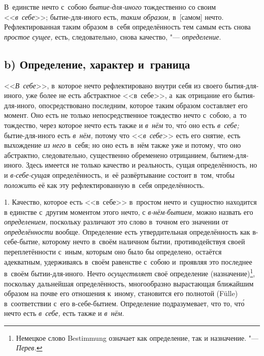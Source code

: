 В~единстве нечто с~собою {\em бытие-для-иного}
тождественно со своим <<{\em в~себе}>>; бытие-для-иного
есть, {\em таким образом,} в~[самом] нечто.
Рефлектированная таким образом в~себя определённость тем самым есть снова
{\em простое сущее,} есть, следовательно, снова
качество, "--- {\em определение}.

\subsection[b) Определение, характер и~граница]{b) Определение, характер и~граница}

<<{\em В~себе}>>, в~которое нечто рефлектировано внутри
себя из своего бытия-для-иного, уже более не есть абстрактное <<в~себе>>,
а~как отрицание его бытия-для-иного, опосредствовано последним, которое
таким образом составляет его момент. Оно есть не только непосредственное
тождество нечто с~собою, а~то тождество, через которое нечто есть также и
{\em в~нём} то, чт\'{о} оно есть {\em в~себе;}
бытие-для-иного есть {\em в~нём,} потому что
<<{\em в~себе}>> есть его снятие, есть выхождение
{\em из него} в~себя; но оно есть в~нём также уже и
потому, что оно абстрактно, следовательно, существенно обременено
отрицанием, бытием-для-иного. Здесь имеется не только качество и
реальность, сущая определённость, но и
{\em в-себе-сущая} определённость, и~её развёртывание
состоит в~том, чтобы {\em положить} её как эту
рефлектированную в~себя определённость.

1. Качество, которое есть <<в~себе>> в~простом нечто и~сущностно находится в
единстве с~другим моментом этого нечто, с {\em в-нём-бытием,} можно назвать его
{\em определением,} поскольку различают это слово в~точном его значении от
{\em определённости} вообще. Определение есть утвердительная определённость как
в-себе-бытие, которому нечто в~своём наличном бытии, противодействуя своей
переплетённости с~иным, которым оно было бы определено, остаётся адекватным,
удерживаясь в~своём равенстве с~собою и~проявляя это последнее в~своём
бытии-для-иного. Нечто {\em осуществляет} своё определение
(назначение)\footnote{Немецкое слово Bestimmung означает как определение, так и
назначение. "--- {\em Перев.}}, поскольку дальнейшая определённость,
многообразно вырастающая ближайшим образом на почве его отношения к~иному,
становится его полнотой (Fülle) в~соответствии с~его в-себе-бытием. Определение
подразумевает, что то, чт\'{о} нечто есть {\em в~себе,} есть также и
{\em в~нём}.

